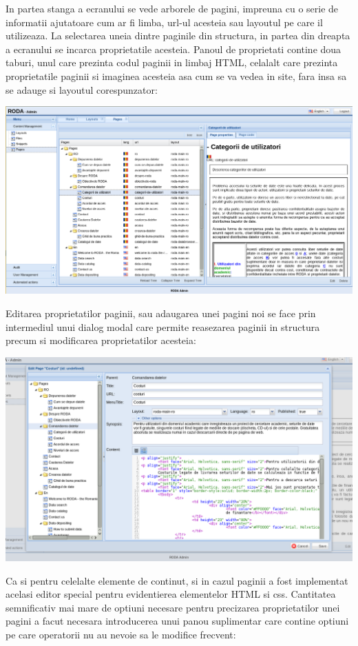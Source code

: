In partea stanga a ecranului se vede arborele de pagini, impreuna
cu o serie de informatii ajutatoare cum ar fi limba, url-ul acesteia
sau layoutul pe care il utilizeaza. La selectarea uneia dintre paginile
din structura, in partea din dreapta a ecranului se incarca proprietatile
acesteia. Panoul de proprietati contine doua taburi, unul care prezinta
codul paginii in limbaj HTML, celalalt care prezinta proprietatile
paginii si imaginea acesteia asa cum se va vedea in site, fara insa
sa se adauge si layoutul corespunzator:

\includegraphics[width=15cm]{cms/backend/pages/cmspages2}

Editarea proprietatilor paginii, sau adaugarea unei pagini noi se
face prin intermediul unui dialog modal care permite reasezarea paginii
in structura precum si modificarea proprietatilor acesteia:

\includegraphics[width=15cm]{cms/backend/pages/cmspages3}

Ca si pentru celelalte elemente de continut, si in cazul paginii a
fost implementat acelasi editor special pentru evidentierea elementelor
HTML si css. Cantitatea semnificativ mai mare de optiuni necesare
pentru precizarea proprietatilor unei pagini a facut necesara introducerea
unui panou suplimentar care contine optiuni pe care operatorii nu
au nevoie sa le modifice frecvent:

